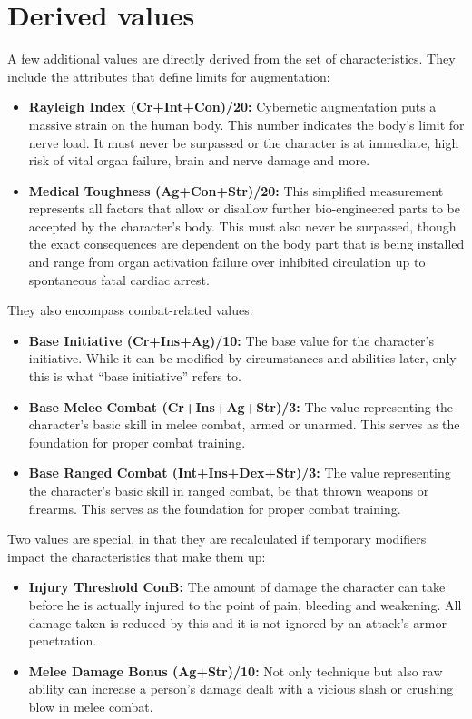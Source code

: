 \documentclass[12pt,a4paper,openany]{book}
\begin{document}
	\section{Derived values}
	A few additional values are directly derived from the set of characteristics. They include the attributes that define limits for augmentation:
	\begin{itemize}
		\setlength\itemsep{-8mm}
		\item \textbf{Rayleigh Index \textlangle(Cr+Int+Con)/20\textrangle:} Cybernetic augmentation puts a massive strain on the human body. This number indicates the body’s limit for nerve load. It must never be surpassed or the character is at immediate, high risk of vital organ failure, brain and nerve damage and more.
		\item \textbf{Medical Toughness \textlangle(Ag+Con+Str)/20\textrangle:} This simplified measurement represents all factors that allow or disallow further bio-engineered parts to be accepted by the character’s body. This must also never be surpassed, though the exact consequences are dependent on the body part that is being installed and range from organ activation failure over inhibited circulation up to spontaneous fatal cardiac arrest.
	\end{itemize}
	
	They also encompass combat-related values:
	\begin{itemize}
		\setlength\itemsep{-8mm}
		\item \textbf{Base Initiative \textlangle(Cr+Ins+Ag)/10\textrangle:} The base value for the character’s initiative. While it can be modified by circumstances and abilities later, only this is what “base initiative” refers to.
		\item \textbf{Base Melee Combat \textlangle(Cr+Ins+Ag+Str)/3\textrangle:} The value representing the character’s basic skill in melee combat, armed or unarmed. This serves as the foundation for proper combat training.
		\item \textbf{Base Ranged Combat \textlangle(Int+Ins+Dex+Str)/3\textrangle:} The value representing the character’s basic skill in ranged combat, be that thrown weapons or firearms. This serves as the foundation for proper combat training.
	\end{itemize}

	Two values are special, in that they are recalculated if temporary modifiers impact the characteristics that make them up:
	\begin{itemize}
		\setlength\itemsep{-8mm}
		\item \textbf{Injury Threshold \textlangle ConB\textrangle:} The amount of damage the character can take before he is actually injured to the point of pain, bleeding and weakening. All damage taken is reduced by this and it is not ignored by an attack’s armor penetration.
		\item \textbf{Melee Damage Bonus \textlangle(Ag+Str)/10\textrangle:} Not only technique but also raw ability can increase a person’s damage dealt with a vicious slash or crushing blow in melee combat.
	\end{itemize}
\end{document}
